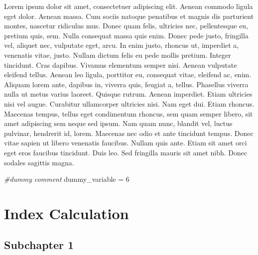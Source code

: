 \documentclass[]{book}
\newenvironment{Shaded}{\begin{snugshade}}{\end{snugshade}}
\newcommand{\DecValTok}[1]{\textcolor[rgb]{0.00,0.00,0.81}{#1}}
\newcommand{\StringTok}[1]{\textcolor[rgb]{0.31,0.60,0.02}{#1}}
\newcommand{\CommentTok}[1]{\textcolor[rgb]{0.56,0.35,0.01}{\textit{#1}}}
\newcommand{\NormalTok}[1]{#1}
\begin{document}
Lorem ipsum dolor sit amet, consectetuer adipiscing elit. Aenean commodo
ligula eget dolor. Aenean massa. Cum sociis natoque penatibus et magnis
dis parturient montes, nascetur ridiculus mus. Donec quam felis,
ultricies nec, pellentesque eu, pretium quis, sem. Nulla consequat massa
quis enim. Donec pede justo, fringilla vel, aliquet nec, vulputate eget,
arcu. In enim justo, rhoncus ut, imperdiet a, venenatis vitae, justo.
Nullam dictum felis eu pede mollis pretium. Integer tincidunt. Cras
dapibus. Vivamus elementum semper nisi. Aenean vulputate eleifend
tellus. Aenean leo ligula, porttitor eu, consequat vitae, eleifend ac,
enim. Aliquam lorem ante, dapibus in, viverra quis, feugiat a, tellus.
Phasellus viverra nulla ut metus varius laoreet. Quisque rutrum. Aenean
imperdiet. Etiam ultricies nisi vel augue. Curabitur ullamcorper
ultricies nisi. Nam eget dui. Etiam rhoncus. Maecenas tempus, tellus
eget condimentum rhoncus, sem quam semper libero, sit amet adipiscing
sem neque sed ipsum. Nam quam nunc, blandit vel, luctus pulvinar,
hendrerit id, lorem. Maecenas nec odio et ante tincidunt tempus. Donec
vitae sapien ut libero venenatis faucibus. Nullam quis ante. Etiam sit
amet orci eget eros faucibus tincidunt. Duis leo. Sed fringilla mauris
sit amet nibh. Donec sodales sagittis magna.

\begin{Shaded}
\begin{Highlighting}[]
\CommentTok{#dummy comment}
\NormalTok{dummy_variable =}\StringTok{ }\DecValTok{6}
\end{Highlighting}
\end{Shaded}

\chapter{Index Calculation}\label{index-calculation}

\section{Subchapter 1}\label{subchapter-1-1}
\end{document}
